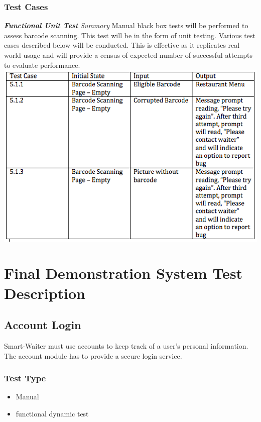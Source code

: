 \documentclass[12pt]{article}
\begin{document}
\subsubsection{Test Cases}
\textbf{\textit{Functional Unit Test}}\newline
\newline
\textit{Summary}\newline
Manual black box tests will be performed to assess barcode scanning. This test will be in the form of unit testing. Various test cases described below will be conducted. This is effective as it replicates real world usage and will provide a census of expected number of successful attempts to evaluate performance.
\newline
\includegraphics{Barcode.png}\newline


\section{Final Demonstration System Test Description}

\subsection{Account Login}
Smart-Waiter must use accounts to keep track of a user's personal information. The account module has to provide a secure login service. 
\subsubsection{Test Type}
\begin{itemize}
  \item Manual
  \item functional dynamic test
\end{itemize}
\end{document}
